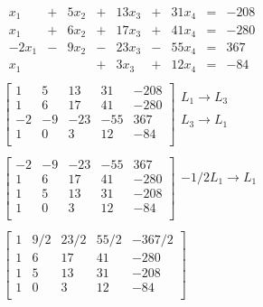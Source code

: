 \documentclass[]{article}
\begin{document}
\[
\begin{array}{rrrrrrrrr}
x_{1} & + & 5 x_{2} & + & 13 x_{3} & + & 31 x_{4} & = & -208 \\ 
x_{1} & + & 6 x_{2} & + & 17 x_{3} & + & 41 x_{4} & = & -280 \\ 
-2 x_{1} & - & 9 x_{2} & - & 23 x_{3} & - & 55 x_{4} & = & 367 \\ 
x_{1} & & & + & 3 x_{3} & + & 12 x_{4} & = & -84 \\ 
\end{array}
\]\[
\begin{array}{l}
\left[
\begin{array}{rrrr|r}
1 & 5 & 13 & 31 & -208 \\ 
1 & 6 & 17 & 41 & -280 \\ 
-2 & -9 & -23 & -55 & 367 \\ 
1 & 0 & 3 & 12 & -84 \\ 
\end{array}
\right]\begin{array}{l}
L_{1} \rightarrow L_{3}\\ 
\\ 
L_{3} \rightarrow L_{1}\\ 
\\ 
\end{array}\\
 \\
\left[
\begin{array}{rrrr|r}
-2 & -9 & -23 & -55 & 367 \\ 
1 & 6 & 17 & 41 & -280 \\ 
1 & 5 & 13 & 31 & -208 \\ 
1 & 0 & 3 & 12 & -84 \\ 
\end{array}
\right]\begin{array}{l}
-1/2 L_{1} \rightarrow L_{1}\\ 
\\ 
\\ 
\\ 
\end{array}\\
 \\
\left[
\begin{array}{rrrr|r}
1 & 9/2 & 23/2 & 55/2 & -367/2 \\ 
1 & 6 & 17 & 41 & -280 \\ 
1 & 5 & 13 & 31 & -208 \\ 
1 & 0 & 3 & 12 & -84 \\ 
\end{array}
\right]\begin{array}{l}

\end{array}
\end{array}\]
\end{document}
